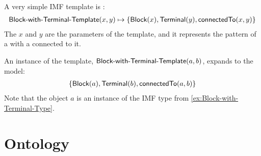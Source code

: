 \begin{example}
  A very simple IMF template is :
  \begin{align*}
    \textsf{Block-with-Terminal-Template}(x,y) \mapsto \{ \textsf{Block}(x), \textsf{Terminal}(y), \textsf{connectedTo}(x,y) \}
  \end{align*}
  The $x$ and $y$ are the parameters of the template, and it
  represents the pattern of a  with a  connected
  to it.

  An instance of the template,
  $\textsf{Block-with-Terminal-Template}(a,b)$, expands to the model:
  \begin{align*}
    \{ \textsf{Block}(a), \textsf{Terminal}(b), \textsf{connectedTo}(a,b) \}
  \end{align*}
  Note that the object $a$ is an instance of the IMF type  from \autoref{ex:Block-with-Terminal-Type}.
\end{example}












\section{Ontology}
\label{sec:ontology}

